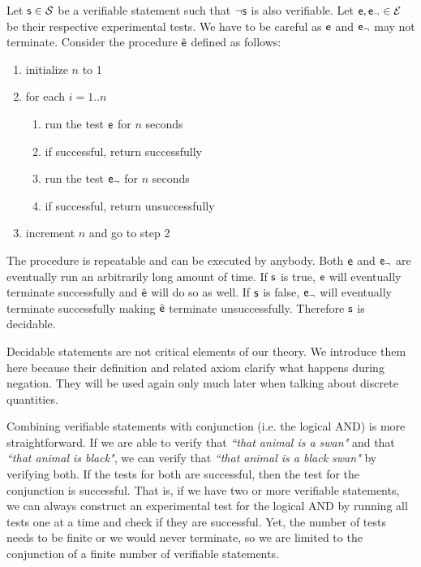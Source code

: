 \documentclass[11pt,letterpaper,fleqn]{memoir} %
\begin{document}
\begin{mathSection}
\begin{justification}
		Let $\mathsf{s} \in \mathcal{S}$ be a verifiable statement such that $\neg\mathsf{s}$ is also verifiable. Let $\mathsf{e}, \mathsf{e}_\neg \in \mathcal{E}$ be their respective experimental tests. We have to be careful as $\mathsf{e}$ and $\mathsf{e}_\neg$ may not terminate. Consider the procedure $\hat{\mathsf{e}}$ defined as follows:
		\begin{enumerate}
			\item initialize $n$ to 1
			\item for each $i=1..n$
			\begin{enumerate}
				\item run the test $\mathsf{e}$ for $n$ seconds
				\item if successful, return successfully
				\item run the test $\mathsf{e}_\neg$ for $n$ seconds
				\item if successful, return unsuccessfully
			\end{enumerate}
			\item increment $n$ and go to step 2
		\end{enumerate}
	    The procedure is repeatable and can be executed by anybody. Both $\mathsf{e}$ and $\mathsf{e}_\neg$ are eventually run an arbitrarily long amount of time. If $\mathsf{s}$ is true, $\mathsf{e}$ will eventually terminate successfully and $\hat{\mathsf{e}}$ will do so as well. If $\mathsf{s}$ is false, $\mathsf{e}_\neg$ will eventually terminate successfully making $\hat{\mathsf{e}}$ terminate unsuccessfully. Therefore $\mathsf{s}$ is decidable.
	\end{justification}

\end{mathSection}

Decidable statements are not critical elements of our theory. We introduce them here because their definition and related axiom clarify what happens during negation. They will be used again only much later when talking about discrete quantities.

Combining verifiable statements with conjunction (i.e. the logical AND) is more straightforward. If we are able to verify that \emph{``that animal is a swan"} and that \emph{``that animal is black"}, we can verify that \emph{``that animal is a black swan"} by verifying both. If the tests for both are successful, then the test for the conjunction is successful. That is, if we have two or more verifiable statements, we can always construct an experimental test for the logical AND by running all tests one at a time and check if they are successful. Yet, the number of tests needs to be finite or we would never terminate, so we are limited to the conjunction of a finite number of verifiable statements.
\end{document}
